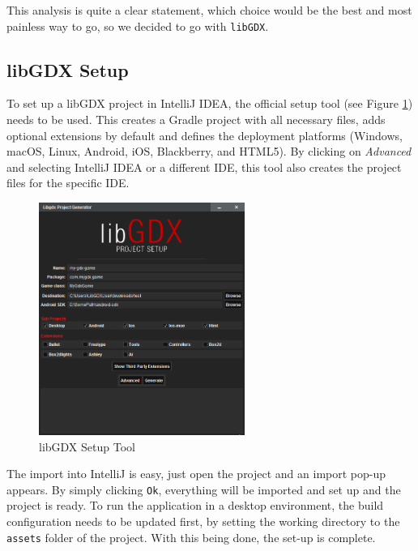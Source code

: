 \documentclass[12p]{article}
\begin{document}
This analysis is quite a clear statement, which choice would be the best and most painless way to go, so we decided to go with \texttt{libGDX}.


\subsection{libGDX Setup} \label{DocSetup}

To set up a libGDX project in IntelliJ IDEA, the official setup tool (see Figure \ref{fig:LibGDXSetupScreenshot}) needs to be used. This creates a Gradle project with all necessary files, adds optional extensions by default and defines the deployment platforms (Windows, macOS, Linux, Android, iOS, Blackberry, and HTML5). By clicking on \emph{Advanced} and selecting IntelliJ IDEA or a different IDE, this tool also creates the project files for the specific IDE.

\begin{figure}[ht]
    \centering
    \includegraphics[width=0.6\textwidth]{libGDX_setup.png}
    \caption{libGDX Setup Tool}
    \label{fig:LibGDXSetupScreenshot}
\end{figure}

The import into IntelliJ is easy, just open the project and an import pop-up appears. By simply clicking \texttt{Ok}, everything will be imported and set up and the project is ready. To run the application in a desktop environment, the build configuration needs to be updated first, by setting the working directory to the \texttt{assets} folder of the project. With this being done, the set-up is complete.
\end{document}
